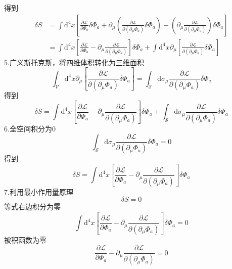 得到
\begin{equation}
    \begin{aligned}
        \delta S&=\int{\mathrm{d}^4x}\left[ \frac{\partial \mathcal{L}}{\partial \Phi _a}\delta \Phi _a+\partial _{\mu}\left( \frac{\partial \mathcal{L}}{\partial \left( \partial _{\mu}\Phi _a \right)}\delta \Phi _a \right) -\left( \partial _{\mu}\frac{\partial \mathcal{L}}{\partial \left( \partial _{\mu}\Phi _a \right)} \right) \delta \Phi _a \right] 
\\
&=\int{\mathrm{d}^4x}\left[ \frac{\partial \mathcal{L}}{\partial \Phi _a}-\partial _{\mu}\frac{\partial \mathcal{L}}{\partial \left( \partial _{\mu}\Phi _a \right)} \right] \delta \Phi _a+\int{\mathrm{d}^4x}\partial _{\mu}\left[ \frac{\partial \mathcal{L}}{\partial \left( \partial _{\mu}\Phi _a \right)}\delta \Phi _a \right] 
    \end{aligned}
\end{equation}
5.广义斯托克斯，将四维体积转化为三维面积
\begin{equation}
    \int_{\mathcal{V}}{\mathrm{d}^4x}\partial _{\mu}\left[ \frac{\partial \mathcal{L}}{\partial \left( \partial _{\mu}\Phi _a \right)}\delta \Phi _a \right] =\int_{\mathcal{S}}{\mathrm{d}\sigma _{\mu}}\frac{\partial \mathcal{L}}{\partial \left( \partial _{\mu}\Phi _a \right)}\delta \Phi _a
\end{equation}
得到
\begin{equation}
    \delta S=\int{\mathrm{d}^4x}\left[ \frac{\partial \mathcal{L}}{\partial \Phi _a}-\partial _{\mu}\frac{\partial \mathcal{L}}{\partial \left( \partial _{\mu}\Phi _a \right)} \right] \delta \Phi _a+\int_{\mathcal{S}}{\mathrm{d}\sigma _{\mu}}\frac{\partial \mathcal{L}}{\partial \left( \partial _{\mu}\Phi _a \right)}\delta \Phi _a
\end{equation}
6.全空间积分为0
\begin{equation}
    \int_{\mathcal{S}}{\mathrm{d}\sigma _{\mu}}\frac{\partial \mathcal{L}}{\partial \left( \partial _{\mu}\Phi _a \right)}\delta \Phi _a=0
\end{equation}
得到
\begin{equation}
    \delta S=\int{\mathrm{d}^4x}\left[ \frac{\partial \mathcal{L}}{\partial \Phi _a}-\partial _{\mu}\frac{\partial \mathcal{L}}{\partial \left( \partial _{\mu}\Phi _a \right)} \right] \delta \Phi _a
\end{equation}
7.利用最小作用量原理
\begin{equation}
    \delta S=0
\end{equation}
等式右边积分为零
\begin{equation}
    \int{\mathrm{d}^4x}\left[ \frac{\partial \mathcal{L}}{\partial \Phi _a}-\partial _{\mu}\frac{\partial \mathcal{L}}{\partial \left( \partial _{\mu}\Phi _a \right)} \right] \delta \Phi _a=0
\end{equation}
被积函数为零
\begin{equation}
    \frac{\partial \mathcal{L}}{\partial \Phi _a}-\partial _{\mu}\frac{\partial \mathcal{L}}{\partial \left( \partial _{\mu}\Phi _a \right)}=0
\end{equation}


